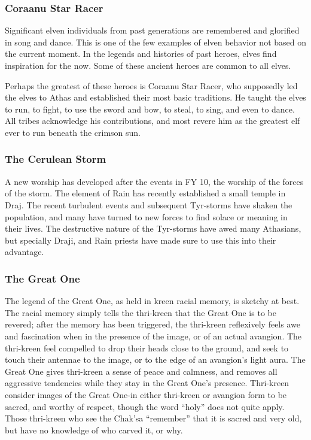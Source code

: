 \subsubsection{Coraanu Star Racer}
Significant elven individuals from past generations are remembered and glorified in song and dance. This is one of the few examples of elven behavior not based on the current moment. In the legends and histories of past heroes, elves find inspiration for the now. Some of these ancient heroes are common to all elves.

Perhaps the greatest of these heroes is Coraanu Star Racer, who supposedly led the elves to Athas and established their most basic traditions. He taught the elves to run, to fight, to use the sword and bow, to steal, to sing, and even to dance. All tribes acknowledge his contributions, and most revere him as the greatest elf ever to run beneath the crimson sun.

\subsubsection{The Cerulean Storm}
A new worship has developed after the events in FY 10, the worship of the forces of the storm. The element of Rain has recently established a small temple in Draj. The recent turbulent events and subsequent Tyr-storms have shaken the population, and many have turned to new forces to find solace or meaning in their lives. The destructive nature of the Tyr-storms have awed many Athasians, but specially Draji, and Rain priests have made sure to use this into their advantage.

\subsubsection{The Great One}
The legend of the Great One, as held in kreen racial memory, is sketchy at best. The racial memory simply tells the thri-kreen that the Great One is to be revered; after the memory has been triggered, the thri-kreen reflexively feels awe and fascination when in the presence of the image, or of an actual avangion. The thri-kreen feel compelled to drop their heads close to the ground, and seek to touch their antennae to the image, or to the edge of an avangion's light aura. The Great One gives thri-kreen a sense of peace and calmness, and removes all aggressive tendencies while they stay in the Great One's presence. Thri-kreen consider images of the Great One-in either thri-kreen or avangion form to be sacred, and worthy of respect, though the word ``holy'' does not quite apply. Those thri-kreen who see the Chak'sa ``remember'' that it is sacred and very old, but have no knowledge of who carved it, or why.

